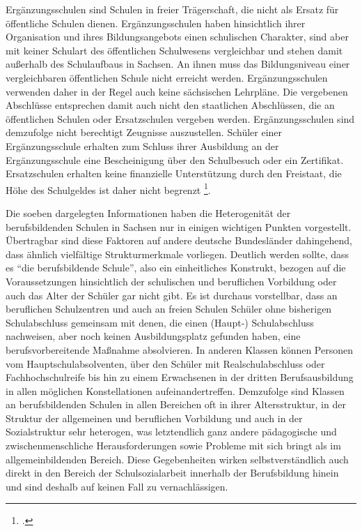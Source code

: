 Ergänzungsschulen sind Schulen in freier Trägerschaft, die nicht als Ersatz für öffentliche Schulen dienen. Ergänzungsschulen haben hinsichtlich ihrer Organisation und ihres Bildungsangebots einen schulischen Charakter, sind aber mit keiner Schulart des öffentlichen Schulwesens vergleichbar und stehen damit außerhalb des Schulaufbaus in Sachsen. An ihnen muss das Bildungsniveau einer vergleichbaren öffentlichen Schule nicht erreicht werden. Ergänzungsschulen verwenden daher in der Regel auch keine sächsischen Lehrpläne. Die vergebenen Abschlüsse entsprechen damit auch nicht den staatlichen Abschlüssen, die an öffentlichen Schulen oder Ersatzschulen vergeben werden. Ergänzungsschulen sind demzufolge nicht berechtigt Zeugnisse auszustellen. Schüler einer Ergänzungsschule erhalten zum Schluss ihrer Ausbildung an der Ergänzungsschule eine Bescheinigung über den Schulbesuch oder ein Zertifikat. Ersatzschulen erhalten keine finanzielle Unterstützung durch den Freistaat, die Höhe des Schulgeldes ist daher nicht begrenzt \footcite[vgl.]{SMKSK2015a}. 

Die soeben dargelegten Informationen haben die Heterogenität der berufsbildenden Schulen in Sachsen nur in einigen wichtigen Punkten vorgestellt. Übertragbar sind diese Faktoren auf andere deutsche Bundesländer dahingehend, dass ähnlich vielfältige Strukturmerkmale vorliegen. Deutlich werden sollte, dass es "`die berufsbildende Schule"', also ein einheitliches Konstrukt, bezogen auf die Voraussetzungen hinsichtlich der schulischen und beruflichen Vorbildung oder auch das Alter der Schüler gar nicht gibt. Es ist durchaus vorstellbar, dass an beruflichen Schulzentren und auch an freien Schulen Schüler ohne bisherigen Schulabschluss gemeinsam mit denen, die einen (Haupt-) Schulabschluss nachweisen, aber noch keinen Ausbildungsplatz gefunden haben, eine berufsvorbereitende Maßnahme absolvieren. In anderen Klassen können Personen vom Hauptschulabsolventen, über den Schüler mit Realschulabschluss oder Fachhochschulreife bis hin zu einem Erwachsenen in der dritten Berufsausbildung in allen möglichen Konstellationen aufeinandertreffen. Demzufolge sind Klassen an berufsbildenden Schulen in allen Bereichen oft in ihrer Altersstruktur, in der Struktur der allgemeinen und beruflichen Vorbildung und auch in der Sozialstruktur sehr heterogen, was letztendlich ganz andere pä\-da\-go\-gische und zwischenmenschliche Herausforderungen sowie Probleme mit sich bringt als im allgemeinbildenden Bereich. Diese Gegebenheiten wirken selbstverständlich auch direkt in den Bereich der Schulsozialarbeit innerhalb der Berufsbildung hinein und sind deshalb auf keinen Fall zu vernachlässigen.

